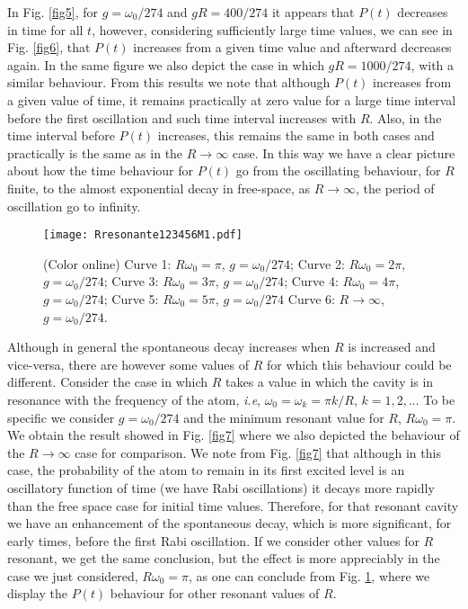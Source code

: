 \documentclass[10pt,english,twocolumn]{revtex4}
\begin{document}
In Fig. \ref{fig5}, for $g=\omega_0/274$ and $gR=400/274$  it appears that $P(t)$ decreases
in time for all $t$, however, considering sufficiently large time
values, we can see in  Fig. \ref{fig6}, that $P(t)$ increases from a given time value and afterward
decreases again. In the
same figure we also depict the case in  which $gR=1000/274$, with a similar behaviour. From this results we note that
although $P(t)$ increases from a given value of time, it remains
practically at zero value for a large time interval before the first
oscillation and such time interval increases with $R$. Also, in the time interval before $P(t)$ increases, this
remains the same in both cases and practically is the same as in  the $R\to\infty$ case. In this way we have a clear
picture about how the time behaviour for $P(t)$ go from the oscillating behaviour, for $R$ finite, to the
almost exponential decay  in  free-space, as $R\to\infty$, the period of oscillation go to infinity.

\begin{figure}[b!]
\texttt{[image: Rresonante123456M1.pdf]}
 \caption{(Color online) Curve 1: $R\omega_0=\pi$, $g=\omega_0/274$;
 Curve 2: $R\omega_0=2\pi$, $g=\omega_0/274$;
Curve 3: $R\omega_0=3\pi$, $g=\omega_0/274$;
Curve 4: $R\omega_0=4\pi$, $g=\omega_0/274$;
Curve 5: $R\omega_0=5\pi$, $g=\omega_0/274$
 Curve 6: $R\to \infty$, $g=\omega_0/274$. }
\label{fig8} 
\end{figure} 
Although in general the spontaneous decay increases when $R$ is
increased and vice-versa, there are however
some values of $R$ for which this behaviour could be different. 
Consider the case in which $R$ takes
a value in which the cavity is in resonance with the frequency of
the atom, {\it i.e},  $\omega_0=\omega_k=\pi k/R$, $k=1,2,..$.
To be specific we consider $g=\omega_0/274$ and the minimum resonant value for $R$,  $R\omega_0=\pi$. 
We obtain the result showed in  Fig. \ref{fig7} where we also depicted the behaviour of
the $R\to\infty$ case for comparison. We note from Fig. \ref{fig7} that although in this case, the probability of the atom
to remain in its first excited level is an oscillatory function of time (we have  Rabi oscillations)
it decays more rapidly than  the free space case for initial time values. Therefore, for that resonant cavity   we have an 
enhancement of the spontaneous decay, which is more significant, for early times, before the first Rabi oscillation.
If we consider other values for $R$ resonant, we get the same conclusion, but the effect is more
appreciably in the case we just considered, $R\omega_0=\pi$, as one can
conclude from Fig. \ref{fig8}, where we display the $P(t)$ behaviour for  other resonant values of $R$. 
\end{document}
